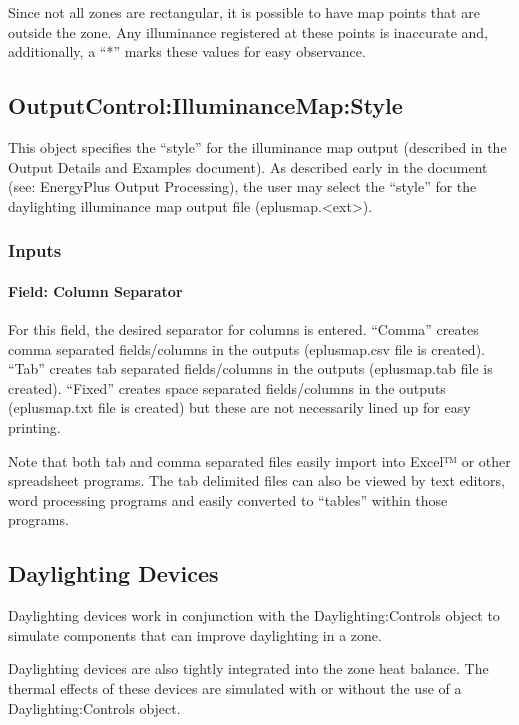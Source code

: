 Since not all zones are rectangular, it is possible to have map points that are outside the zone. Any illuminance registered at these points is inaccurate and, additionally, a ``*'' marks these values for easy observance.

\subsection{OutputControl:IlluminanceMap:Style}\label{outputcontrolilluminancemapstyle}

This object specifies the ``style'' for the illuminance map output (described in the Output Details and Examples document). As described early in the document (see: EnergyPlus Output Processing), the user may select the ``style'' for the daylighting illuminance map output file (eplusmap.\textless{}ext\textgreater{}).

\subsubsection{Inputs}\label{inputs-5-006}

\paragraph{Field: Column Separator}\label{field-column-separator}

For this field, the desired separator for columns is entered. ``Comma'' creates comma separated fields/columns in the outputs (eplusmap.csv file is created). ``Tab'' creates tab separated fields/columns in the outputs (eplusmap.tab file is created). ``Fixed'' creates space separated fields/columns in the outputs (eplusmap.txt file is created) but these are not necessarily lined up for easy printing.

Note that both tab and comma separated files easily import into Excel™ or other spreadsheet programs. The tab delimited files can also be viewed by text editors, word processing programs and easily converted to ``tables'' within those programs.

\subsection{Daylighting Devices}\label{daylighting-devices}

Daylighting devices work in conjunction with the Daylighting:Controls object to simulate components that can improve daylighting in a zone.

Daylighting devices are also tightly integrated into the zone heat balance. The thermal effects of these devices are simulated with or without the use of a Daylighting:Controls object.

